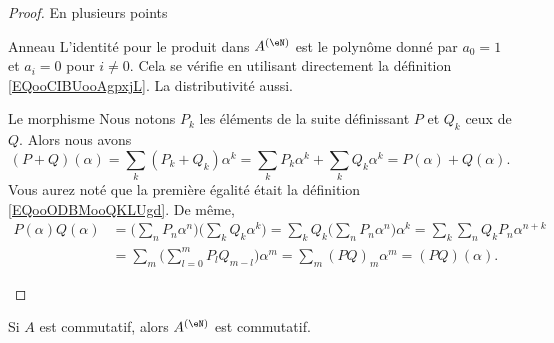 \begin{proof}
    En plusieurs points
    \begin{subproof}
        \item[Anneau]
            L'identité pour le produit dans \( A^{(\eN)}\) est le polynôme donné par \( a_0=1\) et \( a_i=0\) pour \( i\neq 0\). Cela se vérifie en utilisant directement la définition \eqref{EQooCIBUooAgpxjL}. La distributivité aussi.
        \item[Le morphisme]
    Nous notons \( P_k\) les éléments de la suite définissant \( P\) et \( Q_k\) ceux de \( Q\). Alors nous avons
    \begin{equation}
        (P+Q)(\alpha)=\sum_k(P_k+Q_k)\alpha^k=\sum_kP_k\alpha^k+\sum_kQ_k\alpha^k=P(\alpha)+Q(\alpha).
    \end{equation}
    Vous aurez noté que la première égalité était la définition \eqref{EQooODBMooQKLUgd}. De même,
    \begin{subequations}
        \begin{align}
            P(\alpha)Q(\alpha)&=\big( \sum_nP_n\alpha^n \big)\big( \sum_kQ_k\alpha^k \big)=\sum_kQ_k\big( \sum_nP_n\alpha^n \big)\alpha^k=\sum_k\sum_nQ_kP_n\alpha^{n+k}\\
            &=\sum_m\big( \sum_{l=0}^mP_lQ_{m-l} \big)\alpha^m=\sum_m(PQ)_m\alpha^m=(PQ)(\alpha).
        \end{align}
    \end{subequations}
    \end{subproof}
\end{proof}

\begin{lemma}       \label{LEMooWVUXooQlaepO}
    Si \( A\) est commutatif, alors \( A^{(\eN)}\) est commutatif.
\end{lemma}

